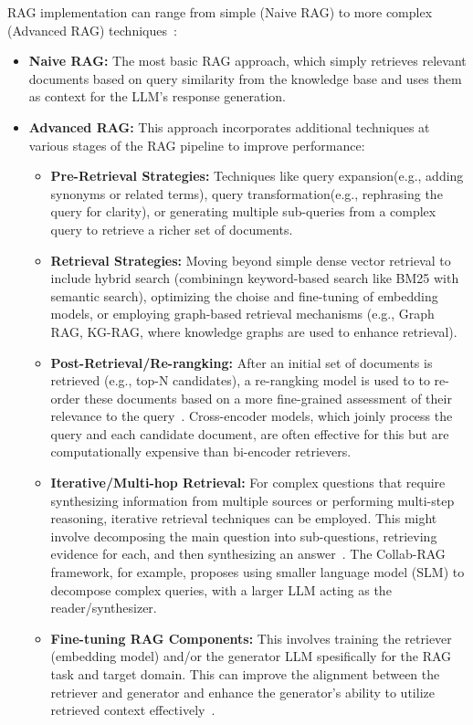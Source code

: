 \documentclass[12pt]{report}
\begin{document}
RAG implementation can range from simple (Naive RAG) to more complex (Advanced RAG) techniques~\cite{gao2024retrievalaugmentedgenerationlargelanguage}:

\begin{itemize}
    \item \textbf{Naive RAG:} The most basic RAG approach, which simply retrieves relevant documents based on query similarity from the knowledge base and uses them as context for the LLM's response generation.
    \item \textbf{Advanced RAG:} This approach incorporates additional techniques at various stages of the RAG pipeline to improve performance:
    \begin{itemize}
      \item \textbf{Pre-Retrieval Strategies:} Techniques like query expansion(e.g., adding synonyms or related terms), query transformation(e.g., rephrasing the query for clarity), or generating multiple sub-queries from a complex query to retrieve a richer set of documents.
      \item \textbf{Retrieval Strategies:} Moving beyond simple dense vector retrieval to include hybrid search (combiningn keyword-based search like BM25 with semantic search), optimizing the choise and fine-tuning of embedding models, or employing graph-based retrieval mechanisms (e.g., Graph RAG, KG-RAG, where knowledge graphs are used to enhance retrieval).
      \item \textbf{Post-Retrieval/Re-rangking:} After an initial set of documents is retrieved (e.g., top-N candidates), a re-rangking model is used to to re-order these documents based on a more fine-grained assessment of their relevance to the query~\cite{Ma_2023}. Cross-encoder models, which joinly process the query and each candidate document, are often effective for this but are computationally expensive than bi-encoder retrievers.
      \item \textbf{Iterative/Multi-hop Retrieval:} For complex questions that require synthesizing information from multiple sources or performing multi-step reasoning, iterative retrieval techniques can be employed. This might involve decomposing the main question into sub-questions, retrieving evidence for each, and then synthesizing an answer~\cite{jin2025searchr1trainingllmsreason}. The Collab-RAG framework, for example, proposes using smaller language model (SLM) to decompose complex queries, with a larger LLM acting as the reader/synthesizer.
      \item \textbf{Fine-tuning RAG Components:} This involves training the retriever (embedding model) and/or the generator LLM spesifically for the RAG task and target domain. This can improve the alignment between the retriever and generator and enhance the generator's ability to utilize retrieved context effectively~\cite{xu2025simragselfimprovingretrievalaugmentedgeneration}.
    \end{itemize}
\end{itemize}
\end{document}
